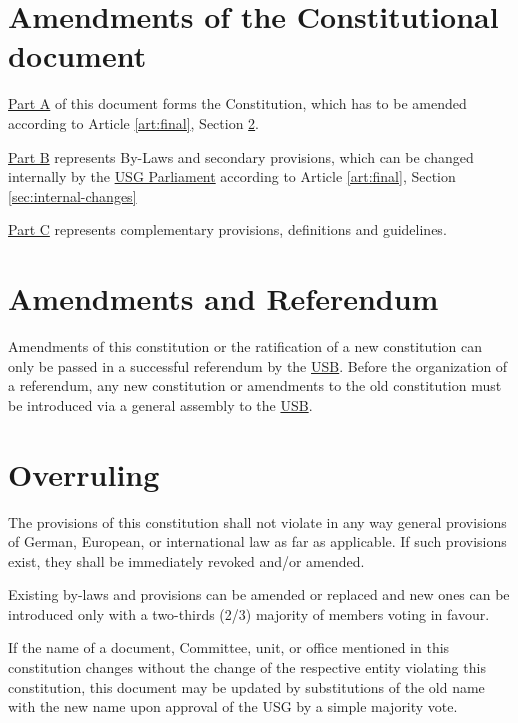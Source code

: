 \label{art:final}

\section{Amendments of the Constitutional document}\label{sec:amend}
\begin{parenum}
\item \hyperref[PartA]{Part A} of this document forms the Constitution, which has to be amended according to Article \protect\ref{art:final}, Section \protect\ref{Ammendments}.
\item \protect\hyperref[PartB]{Part B} represents By-Laws and secondary provisions, which can be changed internally by the \protect\hyperref[USGParliamentDef]{USG Parliament} according to Article \protect\ref{art:final}, Section \protect\ref{sec:internal-changes}
\item \protect\hyperref[PartC]{Part C} represents complementary provisions, definitions and guidelines.
\end{parenum}

\section{Amendments and Referendum}
\label{Ammendments}
Amendments of this constitution or the ratification of a new constitution can only be passed in a successful referendum by the \hyperref[studentbody]{USB}. Before the organization of a referendum, any new constitution or amendments to the old constitution must be introduced via a general assembly to the \hyperref[studentbody]{USB}. 

\section{Overruling} 
The provisions of this constitution shall not violate in any way general provisions of German, European, or international law as far as applicable. If such provisions exist, they shall be immediately revoked and/or amended.

\label{sec:internal-changes}
\begin{parenum}
\item Existing by-laws and provisions can be amended or replaced and new ones can be introduced only with a two-thirds (2/3) majority of members voting in favour.
\item If the name of a document, Committee, unit, or office mentioned in this constitution changes without the change of the respective entity violating this constitution, this document may be updated by substitutions of the old name with the new name upon approval of the USG by a simple majority vote.
\end{parenum}

